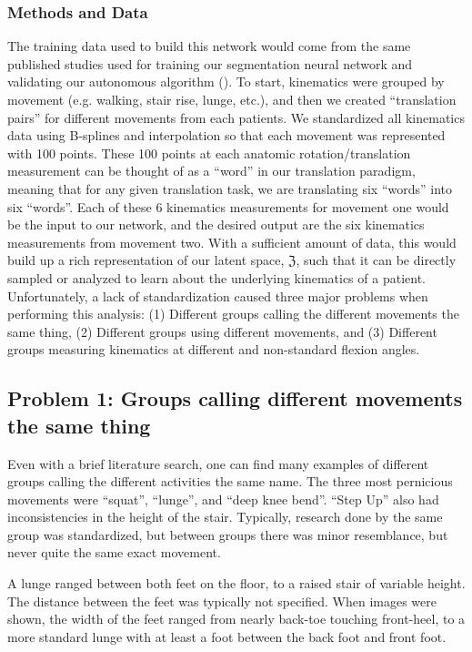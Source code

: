 \subsubsection{Methods and Data}
The training data used to build this network would come from the same published studies used for training our segmentation neural network and validating our autonomous algorithm ().
To start, kinematics were grouped by movement (e.g. walking, stair rise, lunge, etc.), and then we created ``translation pairs'' for different movements from each patients.
We standardized all kinematics data using B-splines and interpolation so that each movement was represented with 100 points.
These 100 points at each anatomic rotation/translation measurement can be thought of as a ``word'' in our translation paradigm, meaning that for any given translation task, we are translating six ``words'' into six ``words''.
Each of these 6 kinematics measurements for movement one would be the input to our network, and the desired output are the six kinematics measurements from movement two.
With a sufficient amount of data, this would build up a rich representation of our latent space, $\mathfrak{Z}$, such that it can be directly sampled or analyzed to learn about the underlying kinematics of a patient.
Unfortunately, a lack of standardization caused three major problems when performing this analysis: (1) Different groups calling the different movements the same thing, (2) Different groups using different movements, and (3) Different groups measuring kinematics at different and non-standard flexion angles.

\subsection{Problem 1: Groups calling different movements the same thing}
Even with a brief literature search, one can find many examples of different groups calling the different activities the same name.
The three most pernicious movements were ``squat'', ``lunge'', and ``deep knee bend''. ``Step Up'' also had inconsistencies in the height of the stair.
Typically, research done by the same group was standardized, but between groups there was minor resemblance, but never quite the same exact movement.

A lunge ranged between both feet on the floor, to a raised stair of variable height. The distance between the feet was typically not specified.
When images were shown, the width of the feet ranged from nearly back-toe touching front-heel, to a more standard lunge with at least a foot between the back foot and front foot.

